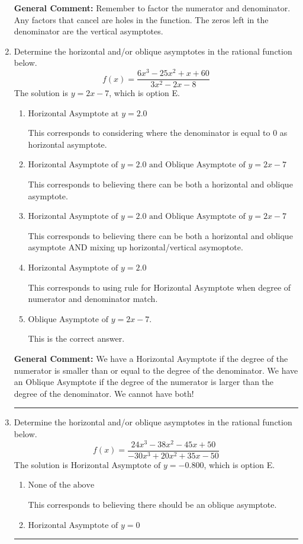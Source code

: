 \documentclass{extbook}[14pt]
\newcommand{\litem}[1]{\item #1

\rule{\textwidth}{0.4pt}}
\begin{document}
\begin{enumerate}
{\textbf{General Comment:} Remember to factor the numerator and denominator. Any factors that cancel are holes in the function. The zeros left in the denominator are the vertical asymptotes.
}
\litem{
Determine the horizontal and/or oblique asymptotes in the rational function below.
\[ f(x) = \frac{6x^{3} -25 x^{2} +x + 60}{3x^{2} -2 x -8} \]The solution is \( y = 2x -7 \), which is option E.\begin{enumerate}[label=\Alph*.]
\item \( \text{Horizontal Asymptote at } y = 2.0 \)

This corresponds to considering where the denominator is equal to 0 as horizontal asymptote.
\item \( \text{Horizontal Asymptote of } y = 2.0 \text{ and Oblique Asymptote of } y = 2x -7 \)

This corresponds to believing there can be both a horizontal and oblique asymptote.
\item \( \text{Horizontal Asymptote of } y = 2.0 \text{ and Oblique Asymptote of } y = 2x -7 \)

This corresponds to believing there can be both a horizontal and oblique asymptote AND mixing up horizontal/vertical asymoptote.
\item \( \text{Horizontal Asymptote of } y = 2.0  \)

This corresponds to using rule for Horizontal Asymptote when degree of numerator and denominator match.
\item \( \text{Oblique Asymptote of } y = 2x -7. \)

This is the correct answer.
\end{enumerate}

\textbf{General Comment:} We have a Horizontal Asymptote if the degree of the numerator is smaller than or equal to the degree of the denominator. We have an Oblique Asymptote if the degree of the numerator is larger than the degree of the denominator. We cannot have both!
}
\litem{
Determine the horizontal and/or oblique asymptotes in the rational function below.
\[ f(x) = \frac{24x^{3} -38 x^{2} -45 x + 50}{-30x^{3} +20 x^{2} +35 x -50} \]The solution is \( \text{Horizontal Asymptote of } y = -0.800  \), which is option E.\begin{enumerate}[label=\Alph*.]
\item \( \text{None of the above} \)

This corresponds to believing there should be an oblique asymptote.
\item \( \text{Horizontal Asymptote of } y = 0  \)


\end{enumerate}}
\end{enumerate}
\end{document}
